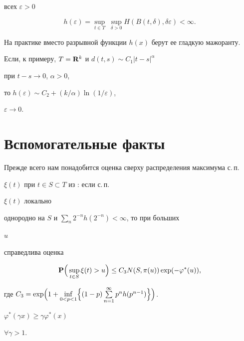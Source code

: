 всех $\varepsilon>0$ 


$$ 


h(\varepsilon)=\sup_{t\in T}\;\sup_{\delta>0} 


H(B(t,\delta),\delta\varepsilon)<\infty. 


$$ 


На практике вместо разрывной функции $h(x)$ берут ее гладкую мажоранту. 


Если, к примеру, $T={\bold R}^k$ и $d(t,s)\sim C_1|t-s|^{\alpha}$ 


при $t-s\to 0$, $\alpha>0$, 


то $h(\varepsilon)\sim C_2+(k/\alpha)\ln(1/\varepsilon)$, 


$\varepsilon\to 0$. 


 


\section{Вспомогательные факты} 


 


Прежде всего нам понадобится оценка сверху распределения максимума с.\,п. 


$\xi(t)$ при $t\in S\subset T$ из \cite{Ost}: если с.\,п. 


$\xi(t)$ локально 


однородно на $S$ и $\sum\limits_n2^{-n}h(2^{-n})<\infty$, то при больших 


$u$ 


справедлива оценка 


\begin{equation} 


{\bold P}\Bigl(\,\sup_{t\in S}\xi(t)>u\Bigr)\le 


C_3N(S,\pi(u))\exp(-\varphi^*(u)), 


\end{equation} 


где $C_3=\exp\Bigl(1+\inf\limits_{0<p<1}\Bigr\{(1-p) 


\sum\limits^{\infty}_{n=1}p^nh(p^{n-1})\Bigr\}\Bigr)$. 


 


\begin{lems} $\varphi^*(\gamma x)\ge\gamma\varphi^*(x)\;$ 


$\forall\gamma>1$. 


\end{lems} 


